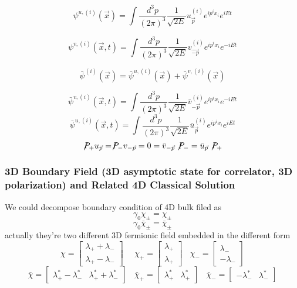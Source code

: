\documentclass[11pt,a4paper]{article}
\begin{document}
\[\psi^{u,(i)}(\vec{x}) = \int \frac{d^3p}{(2\pi)^3} \frac{1}{\sqrt{2E}}  u_{\vec{p}}^{(i)}  e^{ip^i x_i} e^{iEt} \]
    
\[\psi^{v,(i)}(\vec{x},t)= \int \frac{d^3p}{(2\pi)^3}\frac{1}{\sqrt{2E}}v_{\vec{-p}}^{(i)} e^{ip^i x_i}  e^{-iEt}\]
   
\[ \bar\psi^{(i)} (\vec{x})= \bar{\psi}^{u,(i)} (\vec{x})+ \bar{\psi}^{v,(i)}(\vec{x})\]
  
\[  \bar{\psi}^{v,(i)}(\vec{x},t) = \int \frac{d^3p}{(2\pi)^3}  \frac{1}{\sqrt{2E}} \bar v^{(i)}_{-\vec{p}}e^{i p^i x_i}  e^{-iEt}\]
\[    \bar{\psi}^{u,(i)} (\vec{x},t)= \int \frac{d^3p}{(2\pi)^3}\frac{1}{\sqrt{2E}}\bar u^{(i)}_{\vec{p}}  e^{i p^i x_i} e^{iEt} \]
\[ \not \! P_+ u_{\vec{p}} = \not \! P_- v_{-\vec{p}}=0=\bar{v}_{-\vec{p}} \not \! P_- = \bar{u}_{\vec{p}} \not \! P_+\]
\subsubsection{3D Boundary Field (3D asymptotic state for correlator, 3D polarization) and Related 4D Classical Solution}
We could decompose boundary condition of 4D bulk filed as
\[ \gamma_0 \chi_{\pm} = \chi_{\pm}  \]\[\gamma_0\bar \chi_{\pm}=\bar \chi_{\pm}\]actually they're two different 3D fermionic field embedded in the different form
\begin{equation}
\chi =\begin{bmatrix}
\lambda _{+} +\lambda _{-}\\
\lambda _{+} -\lambda _{-}
\end{bmatrix} \ \ \ \ \ \ \chi _{+} =\begin{bmatrix}
\lambda _{+}\\
\lambda _{+}
\end{bmatrix} \ \ \ \ \chi _{-} =\begin{bmatrix}
\lambda _{-}\\
-\lambda _{-}
\end{bmatrix} \label{4to3fermion}
\end{equation}\begin{equation}
\overline{\chi } =\begin{bmatrix}
\lambda _{+}^{*} -\lambda _{-}^{*} & \lambda _{+}^{*} +\lambda _{-}^{*}
\end{bmatrix} \ \ \ \ \overline{\chi }_{+} =\begin{bmatrix}
\lambda _{+}^{*} & \lambda _{+}^{*}
\end{bmatrix} \ \ \ \ \overline{\chi }_{-} =\begin{bmatrix}
-\lambda _{-}^{*} & \lambda _{-}^{*}
\end{bmatrix}\label{4to3fermion2}
\end{equation}
\end{document}
